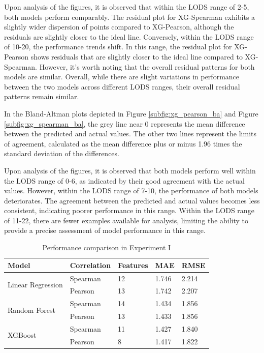 \documentclass[12pt,a4paper,english
]{tunithesis}
\begin{document}
Upon analysis of the figures, it is observed that within the LODS range of 2-5, both models perform comparably. The residual plot for XG-Spearman exhibits a slightly wider dispersion of points compared to XG-Pearson, although the residuals are slightly closer to the ideal line. Conversely, within the LODS range of 10-20, the performance trends shift. In this range, the residual plot for XG-Pearson shows residuals that are slightly closer to the ideal line compared to XG-Spearman. However, it's worth noting that the overall residual patterns for both models are similar. Overall, while there are slight variations in performance between the two models across different LODS ranges, their overall residual patterns remain similar.

In the Bland-Altman plots depicted in Figure \ref{subfig:xg_pearson_ba} and Figure \ref{subfig:xg_spearman_ba}, the grey line near 0 represents the mean difference between the predicted and actual values. The other two lines represent the limits of agreement, calculated as the mean difference plus or minus 1.96 times the standard deviation of the differences.

Upon analysis of the figures, it is observed that both models perform well within the LODS range of 0-6, as indicated by their good agreement with the actual values. However, within the LODS range of 7-10, the performance of both models deteriorates. The agreement between the predicted and actual values becomes less consistent, indicating poorer performance in this range. Within the LODS range of 11-22, there are fewer examples available for analysis, limiting the ability to provide a precise assessment of model performance in this range.


\begin{table}[]
\centering
    \caption{Performance comparison in Experiment I}
    \label{table:Perfomance_comparison}
    \begin{tabular}{|l|l|l|l|l|}
        \hline
        \textbf{Model} & \textbf{Correlation} & \textbf{Features} & \textbf{MAE} & \textbf{RMSE} \\ \hline
        \multirow{2}{*}{Linear Regression} & Spearman & 12 & 1.746 & 2.214 \\ \cline{2-5} 
         & Pearson & 13 & 1.742 & 2.207 \\ \hline
        \multirow{2}{*}{Random Forest} & Spearman & 14 & 1.434 & 1.856 \\ \cline{2-5} 
         & Pearson & 13 & 1.433 & 1.856 \\ \hline
        \multirow{2}{*}{XGBoost} & Spearman & 11& 1.427& 1.840\\ \cline{2-5} 
         & Pearson & 8 & 1.417 & 1.822 \\ \hline
    \end{tabular}
\end{table}
\end{document}
